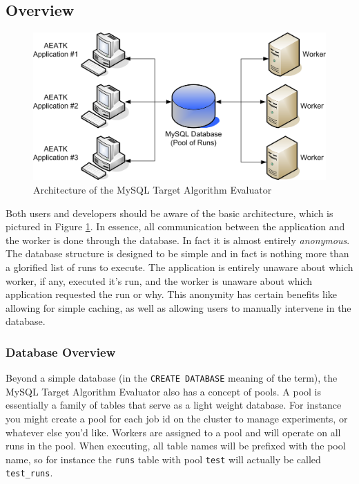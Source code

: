 \documentclass[11pt,letterpaper,oneside]{article}
\begin{document}
\subsection{Overview}


\begin{figure}
\centering
\includegraphics[scale=0.90]{img/Architecture/ArchitectureOverview}
\caption{Architecture of the MySQL Target Algorithm Evaluator}\label{arch}
\end{figure}

Both users and developers should be aware of the basic architecture, which is pictured in Figure \ref{arch}. In essence, all communication between the application and the worker is done through the database. In fact it is almost entirely \emph{anonymous}. The database structure is designed to be simple and in fact is nothing more than a glorified list of runs to execute. The application is entirely unaware about which worker, if any, executed it's run, and the worker is unaware about which application requested the run or why.  This anonymity has certain benefits like allowing for simple caching, as well as allowing users to manually intervene in the database.

\subsubsection{Database Overview} 

Beyond a simple database (in the \texttt{CREATE DATABASE} meaning of the term), the MySQL Target Algorithm Evaluator also has a concept of pools. A pool is essentially a family of tables that serve as a light weight database. For instance you might create a pool for each job id on the cluster to manage experiments, or whatever else you'd like. Workers are assigned to a pool and will operate on all runs in the pool. When executing, all table names will be prefixed with the pool name, so for instance the \texttt{runs} table with pool \texttt{test} will actually be called \texttt{test\_runs}.
\end{document}
